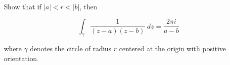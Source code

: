 Show that if $|a| < r < |b|$, then 

$$
\int_{\gamma} \frac{1}{(z - a)(z - b)} \; dz = \frac{2 \pi i}{a - b}
$$

where $\gamma$ denotes the circle of radius $r$ centered at the origin with positive orientation.

\begin{solution}
    \ \\
\end{solution}